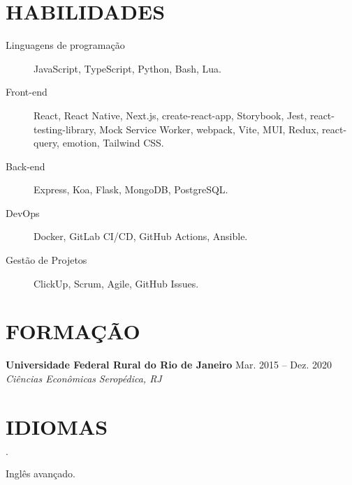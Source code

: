 \documentclass[12pt]{article}
\newenvironment{tightlist}
  {\begin{list}
    {$\cdot$}
    {
      \setlength{\leftmargin}{0em}
      \setlength{\itemsep}{\smallskipamount}
    }
  }
{\end{list}}
\begin{document}
\section*{HABILIDADES}

\begin{description}
  \item[Linguagens de programação] JavaScript, TypeScript, Python, Bash, Lua.
  \item[Front-end] React, React Native, Next.js, create-react-app, Storybook,
    Jest, react-testing-library, Mock Service Worker, webpack, Vite, MUI, Redux,
    react-query, emotion, Tailwind CSS.
  \item[Back-end] Express, Koa, Flask, MongoDB, PostgreSQL.
  \item[DevOps] Docker, GitLab CI/CD, GitHub Actions, Ansible.
  \item[Gestão de Projetos] ClickUp, Scrum, Agile, GitHub Issues.
\end{description}

\section*{FORMAÇÃO}

\textbf{Universidade Federal Rural do Rio de Janeiro} \hfill {Mar. 2015 -- Dez. 2020} \\
\textit{Ciências Econômicas} \hfill \textit{Seropédica, RJ} {\parfillskip=0pt\par}

\section*{IDIOMAS}

\begin{tightlist}
  \item Inglês avançado.
\end{tightlist}
\end{document}
